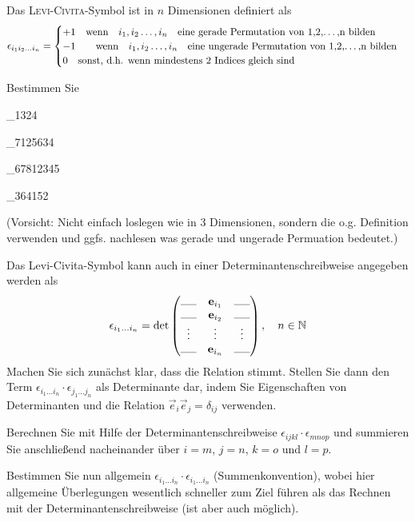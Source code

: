 \begin{atiTask}[
  title = Levi-Civita in n-Dimensionen
]

Das \textsc{Levi-Civita}-Symbol ist in $n$ Dimensionen definiert als
\[
\epsilon_{i_1i_2\dots i_n}=\begin{cases}
+1\quad \text{wenn}\quad  i_1,i_2\dots,i_n\quad \text{eine gerade Permutation von 1,2,\dots,n bilden}\\
-1 \quad \quad \text{wenn}\quad i_1,i_2\dots,i_n\quad \text{eine ungerade Permutation von 1,2,\dots,n bilden} \\
0 \quad \text{sonst, d.h. wenn mindestens 2 Indices gleich sind}
\end{cases}
\]
\begin{atiSubtasks}
	\item Bestimmen Sie
	\begin{multicols}{4}
		\begin{atiSubequations}
			\item{\epsilon_{1324}}
			\item{\epsilon_{7125634}}
			\item{\epsilon_{67812345}}
			\item{\epsilon_{364152}}
		\end{atiSubequations}
		\end{multicols}
	(Vorsicht: Nicht einfach loslegen wie in 3 Dimensionen, sondern die o.g. Definition verwenden und ggfs. nachlesen was gerade und ungerade Permuation bedeutet.)
	\item Das Levi-Civita-Symbol kann auch in einer Determinantenschreibweise angegeben werden als
	\[
	\epsilon_{i_1\dots i_n}=\operatorname{det}\begin{pmatrix}
	\rule{0,5cm}{0.3pt} & \vec{e}_{i_1} &\rule{0,5cm}{0.3pt} \\
	\rule{0,5cm}{0.3pt} & \vec{e}_{i_2} & \rule{0,5cm}{0.3pt} \\
	\vdots & \vdots & \vdots \\
	\rule{0,5cm}{0.3pt} & \vec{e}_{i_n} &\rule{0,5cm}{0.3pt}
	\end{pmatrix}, \quad n\in \mathbb{N}
	\]
	Machen Sie sich zunächst klar, dass die Relation stimmt. Stellen Sie dann den Term $\epsilon_{i_1\dots i_n}\cdot\epsilon_{j_1\dots j_n}$ als Determinante dar, indem Sie Eigenschaften von Determinanten und die Relation $\vec{e}_i\vec{e}_j=\delta_{ij}$ verwenden.
	\item Berechnen Sie mit Hilfe der Determinantenschreibweise $\epsilon_{ijkl}\cdot \epsilon_{mnop}$ und summieren Sie anschließend nacheinander über $i=m$, $j=n$, $k=o$ und $l=p$.
	\item Bestimmen Sie nun allgemein $\epsilon_{i_1\dots i_n}\cdot\epsilon_{i_1\dots i_n}$ (Summenkonvention), wobei hier allgemeine Überlegungen wesentlich schneller zum Ziel führen als das Rechnen mit der Determinantenschreibweise (ist aber auch möglich).
\end{atiSubtasks}


\end{atiTask}
